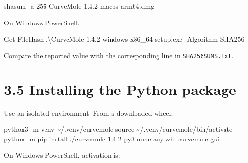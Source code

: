 \documentclass[
  10pt,
  a4paper,
  oneside]{scrreprt}
\newenvironment{Shaded}{}{}
\newcommand{\BuiltInTok}[1]{#1}
\newcommand{\ExtensionTok}[1]{#1}
\newcommand{\FunctionTok}[1]{\textcolor[rgb]{0.02,0.16,0.49}{#1}}
\newcommand{\NormalTok}[1]{#1}
\newcommand{\VariableTok}[1]{\textcolor[rgb]{0.10,0.09,0.49}{#1}}
\begin{document}
\begin{Shaded}
\begin{Highlighting}[]
\ExtensionTok{shasum}\NormalTok{ {-}a 256 CurveMole{-}1.4.2{-}macos{-}arm64.dmg}
\end{Highlighting}
\end{Shaded}

On Windows PowerShell:

\begin{Shaded}
\begin{Highlighting}[]
\NormalTok{Get{-}FileHash .\textbackslash{}CurveMole{-}1.}\FunctionTok{4}\NormalTok{.}\FunctionTok{2}\NormalTok{{-}windows{-}x86\_64{-}setup.}\FunctionTok{exe}\NormalTok{ {-}Algorithm SHA256}
\end{Highlighting}
\end{Shaded}

Compare the reported value with the corresponding line in
\texttt{SHA256SUMS.txt}.

\hypertarget{installing-the-python-package}{%
\section{3.5 Installing the Python
package}\label{installing-the-python-package}}

Use an isolated environment. From a downloaded wheel:

\begin{Shaded}
\begin{Highlighting}[]
\ExtensionTok{python3}\NormalTok{ {-}m venv \textasciitilde{}/.venv/curvemole}
\BuiltInTok{source}\NormalTok{ \textasciitilde{}/.venv/curvemole/bin/activate}
\ExtensionTok{python}\NormalTok{ {-}m pip install ./curvemole{-}1.4.2{-}py3{-}none{-}any.whl}
\ExtensionTok{curvemole}\NormalTok{ gui}
\end{Highlighting}
\end{Shaded}

On Windows PowerShell, activation is:

\begin{Shaded}
\end{Shaded}
\end{document}
